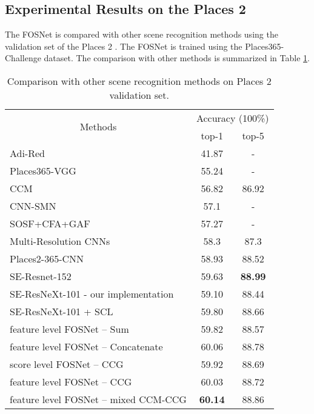 \documentclass[journal,comsoc]{IEEEtran}
\begin{document}
\subsection{Experimental Results on the Places 2}
\label{s43}
The FOSNet is compared with other scene recognition methods using the validation set of the Places 2 \cite{b20}. The FOSNet is trained using the Places365-Challenge dataset. The comparison with other methods is summarized in Table \ref{tab1}.

\begin{table}[]
\centering
\caption{Comparison with other scene recognition methods on Places 2 \cite{b20} validation set.}
\begin{tabular}{lcc}
\toprule
\multicolumn{1}{c}{\multirow{2}{*}{Methods}}   & \multicolumn{2}{c}{Accuracy (100\%)} \\
\multicolumn{1}{c}{}                           & top-1             & top-5            \\ 
\midrule
Adi-Red \cite{b6}                              & 41.87             & -                \\
Places365-VGG \cite{b20}                       & 55.24             & -                \\
CCM \cite{b21}                                 & 56.82             & 86.92            \\
CNN-SMN \cite{b13}                             & 57.1              & -                \\
SOSF+CFA+GAF \cite{b4}                         & 57.27             & -                \\
Multi-Resolution CNNs \cite{b5}                & 58.3              & 87.3             \\
Places2-365-CNN \cite{b45}                     & 58.93             & 88.52            \\
SE-Resnet-152 \cite{b28}                       & 59.63             & \textbf{88.99}   \\
SE-ResNeXt-101 \cite{b28} - our implementation & 59.10             & 88.44            \\
SE-ResNeXt-101 + SCL                           & 59.80             & 88.66            \\
feature level FOSNet – Sum                     & 59.82             & 88.57            \\
feature level FOSNet – Concatenate             & 60.06             & 88.78            \\
score level FOSNet – CCG                      & 59.92             & 88.69            \\
feature level FOSNet – CCG                    & 60.03             & 88.72            \\
feature level FOSNet – mixed CCM-CCG          & \textbf{60.14}    & 88.86    \\       
\bottomrule
\end{tabular}
\label{tab1}
\end{table}
\end{document}
